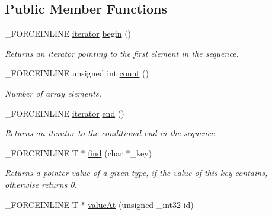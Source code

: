\subsection*{Public Member Functions}
\begin{DoxyCompactItemize}
\item 
\hypertarget{classbt_1_1_map_name_a0480ee67bdf7f40f75840c14ce82304a}{\-\_\-\-F\-O\-R\-C\-E\-I\-N\-L\-I\-N\-E \hyperlink{classbt_1_1_map_name_1_1iterator}{iterator} \hyperlink{classbt_1_1_map_name_a0480ee67bdf7f40f75840c14ce82304a}{begin} ()}\label{classbt_1_1_map_name_a0480ee67bdf7f40f75840c14ce82304a}

\begin{DoxyCompactList}\small\item\em Returns an iterator pointing to the first element in the sequence. \end{DoxyCompactList}\item 
\hypertarget{classbt_1_1_map_name_ae4477bab2b16a771db2080bcc9351be2}{\-\_\-\-F\-O\-R\-C\-E\-I\-N\-L\-I\-N\-E unsigned int \hyperlink{classbt_1_1_map_name_ae4477bab2b16a771db2080bcc9351be2}{count} ()}\label{classbt_1_1_map_name_ae4477bab2b16a771db2080bcc9351be2}

\begin{DoxyCompactList}\small\item\em Number of array elements. \end{DoxyCompactList}\item 
\hypertarget{classbt_1_1_map_name_af44ff134be7544ae63a44edbcd35540a}{\-\_\-\-F\-O\-R\-C\-E\-I\-N\-L\-I\-N\-E \hyperlink{classbt_1_1_map_name_1_1iterator}{iterator} \hyperlink{classbt_1_1_map_name_af44ff134be7544ae63a44edbcd35540a}{end} ()}\label{classbt_1_1_map_name_af44ff134be7544ae63a44edbcd35540a}

\begin{DoxyCompactList}\small\item\em Returns an iterator to the conditional end in the sequence. \end{DoxyCompactList}\item 
\hypertarget{classbt_1_1_map_name_acfbfcae2c5bc270c06e4c493c4acd1ff}{\-\_\-\-F\-O\-R\-C\-E\-I\-N\-L\-I\-N\-E T $\ast$ \hyperlink{classbt_1_1_map_name_acfbfcae2c5bc270c06e4c493c4acd1ff}{find} (char $\ast$\-\_\-key)}\label{classbt_1_1_map_name_acfbfcae2c5bc270c06e4c493c4acd1ff}

\begin{DoxyCompactList}\small\item\em Returns a pointer value of a given type, if the value of this key contains, otherwise returns 0. \end{DoxyCompactList}\item 
\hypertarget{classbt_1_1_map_name_aadf88b5198dd2622b6f424c505d01c43}{\-\_\-\-F\-O\-R\-C\-E\-I\-N\-L\-I\-N\-E T $\ast$ \hyperlink{classbt_1_1_map_name_aadf88b5198dd2622b6f424c505d01c43}{value\-At} (unsigned \-\_\-int32 id)}\label{classbt_1_1_map_name_aadf88b5198dd2622b6f424c505d01c43}


\end{DoxyCompactItemize}
